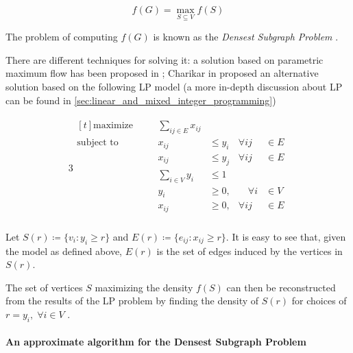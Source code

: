 \begin{equation}
	f(G) = \max_{S \subseteq V} {f(S)}
\end{equation}

The problem of computing $f(G)$ is known as the \emph{Densest Subgraph Problem}
\cite{charikar2000greedy}.

There are different techniques for solving it: a solution based on parametric
maximum flow has been proposed in \cite{Gallo1989}; Charikar in
\cite{charikar2000greedy} proposed an alternative solution based on the
following \acrlong{LP} model (a more in-depth discussion about \acrshort{LP}
can be found in \autoref{sec:linear_and_mixed_integer_programming})

\begin{alignat}{3}
	\label{eq:standard-form}
	\begin{aligned}[t]
		\text{maximize}   &       & \sum_{ij \in E} x_{ij}                 \\
		\text{subject to} & \quad & x_{ij}                  & \leq y_{i} &
		\forall ij        & \in E                                          \\
		                  &       & x_{ij}                  & \leq y_{j} &
		\forall ij        & \in E                                          \\
		                  &       & \sum^{}_{i \in V} y_{i} & \leq 1     & \\
		                  &       & y_{i}                   & \geq 0,    &
		\quad \forall i   & \in V                                          \\
		                  &       & x_{ij}                  & \geq 0,    &
		\forall ij        & \in E                                          \\
	\end{aligned}
\end{alignat}

Let $S(r) \coloneqq \{v_{i} : y_{i} \geq r\} $ and $E(r) \coloneqq \{e_{ij} :
	x_{ij} \geq r\} $. It is easy to see that, given the model as defined
above, $E(r)$ is the set of edges induced by the vertices in $S(r)$.

The set of vertices $S$ maximizing the density $f(S)$ can then be reconstructed
from the results of the \acrshort{LP} problem by finding the density of $S(r)$
for choices of $r = y_{i}, \; \forall i \in V $ \cite{charikar2000greedy}.

\paragraph{An approximate algorithm for the Densest Subgraph Problem}%
\label{par:an_approximate_algorithm_for_the_densest_subgraph_problem}

